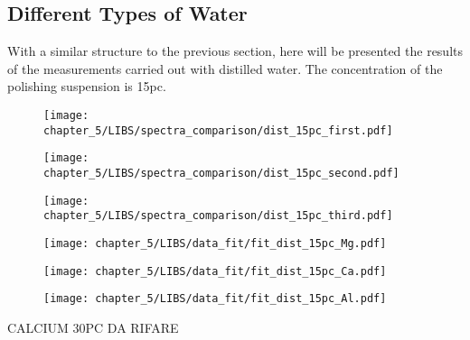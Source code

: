 \subsection{Different Types of Water}
\label{subsec:different_type_of_water}

With a similar structure to the previous section, here will be presented the results of the measurements carried out with distilled water. The concentration of the polishing suspension is 15pc.

\begin{figure}[H]
    \centering
    \texttt{[image: chapter\_5/LIBS/spectra\_comparison/dist\_15pc\_first.pdf]} 
 \end{figure}

\vspace*{-68pt}
\begin{figure}[H]
    \centering
    \texttt{[image: chapter\_5/LIBS/spectra\_comparison/dist\_15pc\_second.pdf]} 
 \end{figure}

\vspace*{-68pt}
\begin{figure}[H]
    \centering
    \texttt{[image: chapter\_5/LIBS/spectra\_comparison/dist\_15pc\_third.pdf]} 
 \end{figure}


 \begin{figure}[H]
    \centering
    \texttt{[image: chapter\_5/LIBS/data\_fit/fit\_dist\_15pc\_Mg.pdf]} 
 \end{figure}

 \begin{figure}[H]
    \centering
    \texttt{[image: chapter\_5/LIBS/data\_fit/fit\_dist\_15pc\_Ca.pdf]} 
 \end{figure}
    \vspace{-40pt}
 \begin{figure}[H]
    \centering
    \texttt{[image: chapter\_5/LIBS/data\_fit/fit\_dist\_15pc\_Al.pdf]} 
 \end{figure}

CALCIUM 30PC DA RIFARE